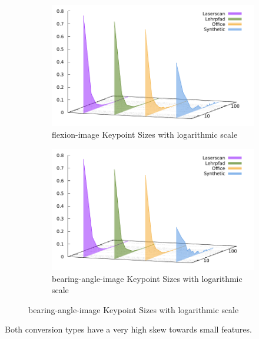 \begin{figure}[H]
\begin{subfigure}[t]{0.45\linewidth}
    \includegraphics[width=\linewidth]{chapter06/results/SIFT/flexion/size.pdf}%
    \caption{\gls{flexion-image} Keypoint Sizes with logarithmic scale}
\end{subfigure}\quad
\begin{subfigure}[t]{0.45\linewidth}
    \includegraphics[width=\linewidth]{chapter06/results/SIFT/bearing/size.pdf}%
    \caption{\gls{bearing-angle-image} Keypoint Sizes with logarithmic scale}
\end{subfigure}
\end{figure}
Both conversion types have a very high skew towards small features.

